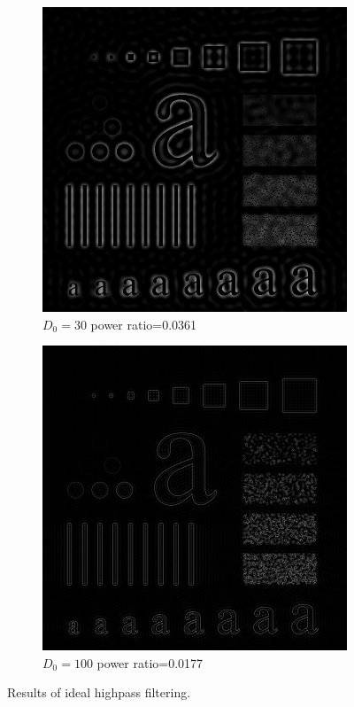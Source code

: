 \begin{figure}[h!]
\begin{subfigure}[b]{0.3\linewidth}
		\includegraphics[width=\linewidth]{myfigure/p3/IHPF_30.png}
		\caption{$D_0=30$ power ratio=0.0361}
		\label{fig:IHPF_30}
	\end{subfigure}
	\begin{subfigure}[b]{0.3\linewidth}
		\includegraphics[width=\linewidth]{myfigure/p3/IHPF_100.png}
		\caption{$D_0=100$ power ratio=0.0177}
		\label{fig:IHPF_100}
	\end{subfigure}
  	\caption{Results of ideal highpass filtering.}
  	\label{fig:IHPF}
\end{figure}

